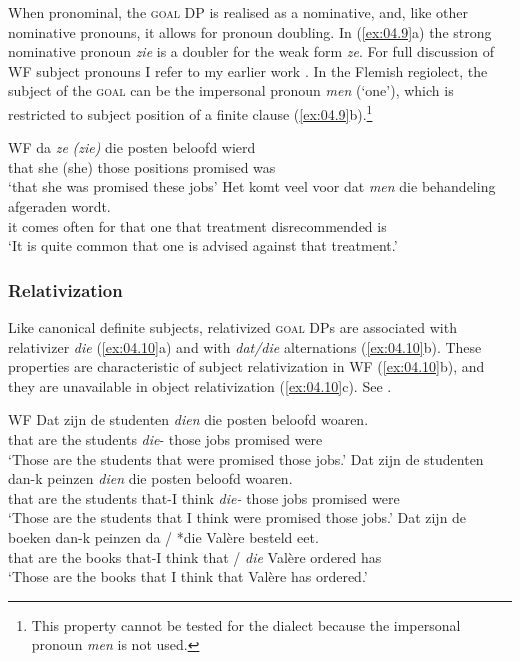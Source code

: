 \documentclass[output=paper]{langsci/langscibook}
\begin{document}
When pronominal, the \textsc{goal} DP is realised as a nominative, and, like other nominative pronouns, it allows for
pronoun doubling. In (\ref{ex:04.9}a) the strong nominative pronoun \emph{zie} is a doubler for the weak form \emph{ze}. For full
discussion of \gls{WF} subject pronouns I refer to my earlier
work \parencite{Haegeman1991,Haegeman1992,Haegeman2004}. In the Flemish
regiolect, the subject of the \textsc{goal}  can be the impersonal
pronoun \emph{men} (‘one’), which is restricted to subject position of a finite
clause (\ref{ex:04.9}b).\footnote{This property cannot be tested for the
dialect because the impersonal pronoun \emph{men} is not used.}\largerpage[-2]

\ea\label{ex:04.9}\glsdesc{WF}
    \ea
    \gll   da   \textit{ze} \textit{(zie)}   die posten     beloofd   wierd\\
		    that   she (she)   those positions   promised   was\\
	\glt     ‘that she was promised these jobs’
    \ex
	\gll   Het   komt   veel   voor  dat   \textit{men}   die   behandeling afgeraden     wordt.\\
		it   comes often   for   that   one   that   treatment disrecommended   is\\
	\glt ‘It is quite common that one is advised against that treatment.’
    \z
\z

\subsubsection{Relativization}

Like canonical definite subjects, relativized
\textsc{goal} DPs are associated with relativizer
\emph{die} (\ref{ex:04.10}a) and with \emph{dat/die} alternations
(\ref{ex:04.10}b). These properties are characteristic of subject relativization
in \gls{WF} (\ref{ex:04.10}b), and they are unavailable in
object relativization (\ref{ex:04.10}c). See
\textcite{Haegeman1984,Haegeman1992}.

\ea\label{ex:04.10}\glsdesc{WF}
    \ea
	\gll   Dat   zijn   de studenten   \textit{dien}   die posten   beloofd   woaren.\\
		    that   are   the students   \emph{die}{}-\Pl{}   those jobs   promised   were\\
	\glt     ‘Those are the students that were promised those jobs.’
    \ex
	\gll   Dat   zijn   de   studenten   dan-k   peinzen \textit{dien}   die   posten   beloofd woaren.\\
		that   are   the   students   that-I   think \emph{die-}\Pl{}   those   jobs   promised were\\
	\glt     ‘Those are the students that I think were promised those jobs.’
    \ex
	\gll   Dat zijn   de boeken   dan-k   peinzen da / *die   Valère     besteld   eet.\\
    that are   the books   that-I   think that {/} \hphantom{*}\emph{die}   Valère   ordered   has\\
	\glt     ‘Those are the books that I think that Valère has ordered.’
    \z
\z
\end{document}
